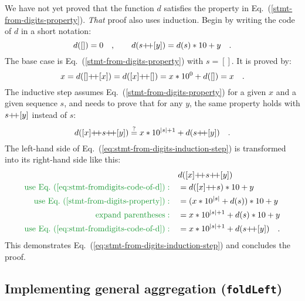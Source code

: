 We have not yet proved that the function $d$ satisfies the property
in Eq.~(\ref{stmt-from-digits-property}). \emph{That} proof also
uses induction. Begin by writing the code of $d$ in a short notation:
\begin{equation}
d(\left[\right])=0\quad,\quad\quad d(s{\displaystyle }{+\negmedspace+}[y])=d(s)*10+y\quad.\label{eq:stmt-fromdigits-code-of-d}
\end{equation}
The base case is Eq.~(\ref{stmt-from-digits-property}) with $s=[]$.
It is proved by:
\[
x=d([]{\displaystyle }{+\negmedspace+}[x])=d([x]{\displaystyle }{+\negmedspace+}[])=x*10^{0}+d(\left[\right])=x\quad.
\]
The inductive step assumes Eq.~(\ref{stmt-from-digits-property})
for a given $x$ and a given sequence $s$, and needs to prove that
for any $y$, the same property holds with $s{\displaystyle }{+\negmedspace+}[y]$ instead of
$s$:
\begin{equation}
d([x]{\displaystyle }{+\negmedspace+} s{\displaystyle }{+\negmedspace+}[y])\overset{?}{=}x*10^{\left|s\right|+1}+d(s{\displaystyle }{+\negmedspace+}[y])\quad.\label{eq:stmt-from-digits-induction-step}
\end{equation}
The left-hand side of Eq.~(\ref{eq:stmt-from-digits-induction-step})
is transformed into its right-hand side like this:
\begin{align*}
 & d([x]\pplus s\pplus[y])\\
{\color{greenunder}\text{use Eq.~(\ref{eq:stmt-fromdigits-code-of-d})}:}\quad & =d([x]\pplus s)*10+y\\
{\color{greenunder}\text{use Eq.~(\ref{stmt-from-digits-property})}:}\quad & =(x*10^{\left|s\right|}+d(s))*10+y\\
{\color{greenunder}\text{expand parentheses}:}\quad & =x*10^{\left|s\right|+1}+d(s)*10+y\\
{\color{greenunder}\text{use Eq.~(\ref{eq:stmt-fromdigits-code-of-d})}:}\quad & =x*10^{\left|s\right|+1}+d(s\pplus[y])\quad.
\end{align*}
This demonstrates Eq.~(\ref{eq:stmt-from-digits-induction-step})
and concludes the proof.

\subsection{Implementing general aggregation (\texttt{foldLeft})\label{subsec:implementing-general-aggregation-foldleft}}

